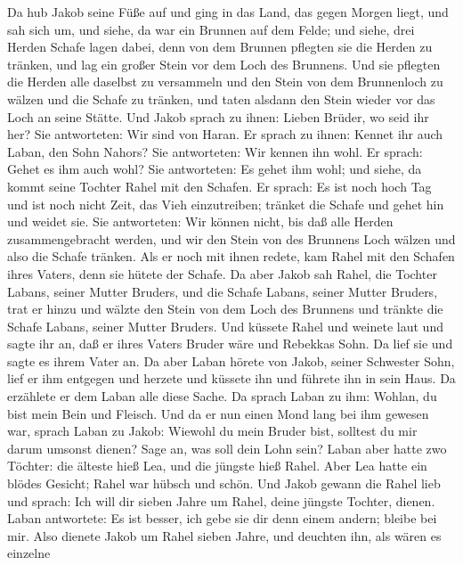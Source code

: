  Da hub Jakob seine Füße auf und ging in das Land, das gegen
Morgen liegt,  und sah sich um, und siehe, da war ein
Brunnen auf dem Felde; und siehe, drei Herden Schafe lagen dabei, denn
von dem Brunnen pflegten sie die Herden zu tränken, und lag ein großer
Stein vor dem Loch des Brunnens.  Und sie pflegten die
Herden alle daselbst zu versammeln und den Stein von dem Brunnenloch zu
wälzen und die Schafe zu tränken, und taten alsdann den Stein wieder vor
das Loch an seine Stätte.  Und Jakob sprach zu ihnen: Lieben
Brüder, wo seid ihr her? Sie antworteten: Wir sind von Haran.
 Er sprach zu ihnen: Kennet ihr auch Laban, den Sohn Nahors?
Sie antworteten: Wir kennen ihn wohl.  Er sprach: Gehet es
ihm auch wohl? Sie antworteten: Es gehet ihm wohl; und siehe, da kommt
seine Tochter Rahel mit den Schafen.  Er sprach: Es ist noch
hoch Tag und ist noch nicht Zeit, das Vieh einzutreiben; tränket die
Schafe und gehet hin und weidet sie.  Sie antworteten: Wir
können nicht, bis daß alle Herden zusammengebracht werden, und wir den
Stein von des Brunnens Loch wälzen und also die Schafe tränken.
 Als er noch mit ihnen redete, kam Rahel mit den Schafen
ihres Vaters, denn sie hütete der Schafe.  Da aber Jakob
sah Rahel, die Tochter Labans, seiner Mutter Bruders, und die Schafe
Labans, seiner Mutter Bruders, trat er hinzu und wälzte den Stein von
dem Loch des Brunnens und tränkte die Schafe Labans, seiner Mutter
Bruders.  Und küssete Rahel und weinete laut 
und sagte ihr an, daß er ihres Vaters Bruder wäre und Rebekkas Sohn. Da
lief sie und sagte es ihrem Vater an.  Da aber Laban hörete
von Jakob, seiner Schwester Sohn, lief er ihm entgegen und herzete und
küssete ihn und führete ihn in sein Haus. Da erzählete er dem Laban alle
diese Sache.  Da sprach Laban zu ihm: Wohlan, du bist mein
Bein und Fleisch. Und da er nun einen Mond lang bei ihm gewesen war,
 sprach Laban zu Jakob: Wiewohl du mein Bruder bist,
solltest du mir darum umsonst dienen? Sage an, was soll dein Lohn sein?
 Laban aber hatte zwo Töchter: die älteste hieß Lea, und
die jüngste hieß Rahel.  Aber Lea hatte ein blödes Gesicht;
Rahel war hübsch und schön.  Und Jakob gewann die Rahel
lieb und sprach: Ich will dir sieben Jahre um Rahel, deine jüngste
Tochter, dienen.  Laban antwortete: Es ist besser, ich gebe
sie dir denn einem andern; bleibe bei mir.  Also dienete
Jakob um Rahel sieben Jahre, und deuchten ihn, als wären es einzelne
